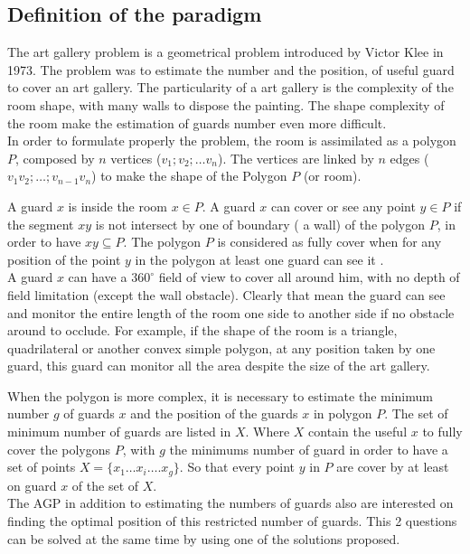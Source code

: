 	\subsection{Definition of the paradigm} \label{sec:AGPdef}
	The art gallery problem is a geometrical problem introduced by Victor Klee in 1973. The problem was to estimate the number and the position, of useful guard to cover an art gallery. 
The particularity of a art gallery is the complexity of the room shape, with many walls to dispose the painting. The shape complexity of the room make the estimation of guards number even more difficult.\\
In order to formulate properly the problem, the room is assimilated as a polygon $P$, composed by $n$ vertices ($v_1; v_2;…v_n$). The vertices are linked by $n$ edges ($v_1 v_2;…; v_{n-1} v_n$) to make the shape of the Polygon $P$ (or room).

A guard $x$ is inside the room $x \in P$. A guard $x$ can cover or see any point $y \in P$ if the segment $xy$ is not intersect by one of boundary ( a wall) of the polygon $P$, in order to have $ xy \subseteq P$.
The polygon $P$ is considered as fully cover when for any position of the point $y$ in the polygon at least one guard can see it .\\
A guard $x$ can have a $360^\circ$ field of view to cover all around him, with no depth of field limitation (except the wall obstacle). Clearly that mean the guard can see and monitor the entire length of the room one side to another side if no obstacle around to occlude. For example, if the shape of the room is a triangle, quadrilateral or another convex simple polygon, at any position taken by one guard, this guard can monitor all the area despite the size of the art gallery. 

When the polygon is more complex, it is necessary to estimate the minimum number $g$ of guards $x$ and the position of the guards $x$ in polygon $P$. 
 The set of minimum number of guards are listed in $X$. Where $X$ contain the useful $x$ to fully cover the polygons $P$, with $g$ the minimums number of guard in order to have a set of points $X=\{x_1…x_i…. x_g\}$. So that every point $y$ in $P$  are cover by at least on guard $x$ of the set of $X$. \\
The AGP in addition to estimating the numbers of guards also are interested on finding the optimal position of this restricted number of guards. 
This 2 questions can be solved at the same time by using one of the solutions proposed.


